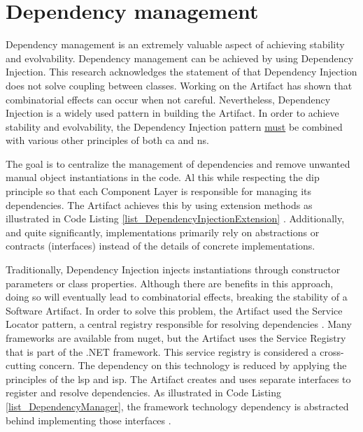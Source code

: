\section{Dependency management} Dependency management is an extremely valuable aspect of
achieving stability and evolvability. Dependency management can be achieved by using
Dependency Injection. This research acknowledges the statement of
\textcite[215]{mannaert_normalized_2016} that Dependency Injection does not solve coupling
between classes. Working on the Artifact has shown that combinatorial effects can occur
when not careful. Nevertheless, Dependency Injection is a widely used pattern in building
the Artifact. In order to achieve stability and evolvability, the Dependency Injection
pattern \underline{must} be combined with various other principles of both \gls{ca} and
\gls{ns}. 

The goal is to centralize the management of dependencies and remove unwanted manual object
instantiations in the code. Al this while respecting the \gls{dip} principle so that each
Component Layer is responsible for managing its dependencies. The Artifact achieves this
by using extension methods as illustrated in Code Listing
\ref{list_DependencyInjectionExtension}
\parencite{koks_dependencyinjectionextension_2023}. Additionally, and quite significantly,
implementations primarily rely on abstractions or contracts (interfaces) instead of the
details of concrete implementations. 

Traditionally, Dependency Injection injects instantiations through constructor parameters
or class properties. Although there are benefits in this approach, doing so will
eventually lead to combinatorial effects, breaking the stability of a Software Artifact.
In order to solve this problem, the Artifact used the Service Locator pattern, a central
registry responsible for resolving dependencies \parencite{wikipedia_service_2023}. Many
frameworks are available from \gls{nuget}, but the Artifact uses the Service Registry that
is part of the .NET framework. This service registry is considered a cross-cutting
concern. The dependency on this technology is reduced by applying the principles of the
\gls{lsp} and \gls{isp}. The Artifact creates and uses separate interfaces to register
\parencite{koks_idependencymanagerinteractor_2023} and resolve
\parencite{koks_idependencyfactoryinteractor_2023} dependencies. As illustrated in Code
Listing \ref{list_DependencyManager}, the framework technology dependency is abstracted
behind implementing those interfaces \parencite{koks_dependencymanagerinteractor_2023}. 

